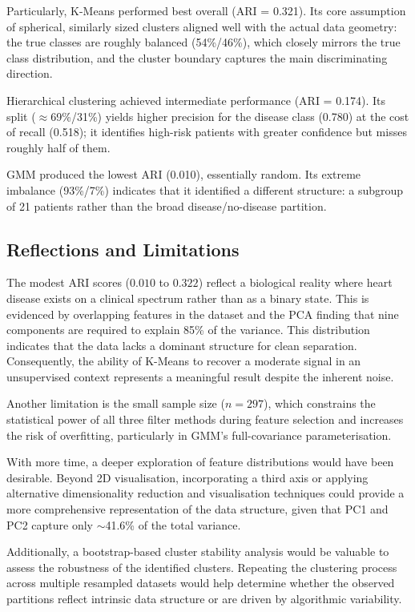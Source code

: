 \documentclass[twocolumn, fontsize=10pt]{article}
\begin{document}
Particularly,  {K-Means} performed best overall (ARI = 0.321). Its core assumption of spherical, similarly sized clusters aligned well with the actual data geometry: the true classes are roughly balanced (54\%/46\%), which closely mirrors the true class distribution, and the cluster boundary captures the main discriminating direction.

 {Hierarchical clustering} achieved intermediate performance (ARI = 0.174). Its split ($\approx$69\%/31\%) yields higher precision for the disease class (0.780) at the cost of recall (0.518); it identifies high-risk patients with greater confidence but misses roughly half of them.

 {GMM} produced the lowest ARI (0.010), essentially random. Its extreme imbalance (93\%/7\%) indicates that it identified a different structure: a subgroup of 21 patients rather than the broad disease/no-disease partition. 




\subsection{Reflections and Limitations}

The modest ARI scores ($0.010$ to $0.322$) reflect a biological reality where heart disease exists on a clinical spectrum rather than as a binary state. This is evidenced by overlapping features in the dataset and the PCA finding that nine components are required to explain 85\% of the variance. This distribution indicates that the data lacks a dominant structure for clean separation. Consequently, the ability of K-Means to recover a moderate signal in an unsupervised context represents a meaningful result despite the inherent noise.

Another limitation is the small sample size ($n = 297$), which constrains the statistical power of all three filter methods during feature selection and increases the risk of overfitting, particularly in GMM's full-covariance parameterisation. 

With more time, a deeper exploration of feature distributions would have been desirable. Beyond 2D visualisation, incorporating a third axis or applying alternative dimensionality reduction and visualisation techniques could provide a more comprehensive representation of the data structure, given that PC1 and PC2 capture only $\sim$41.6\% of the total variance.

Additionally, a bootstrap-based cluster stability analysis would be valuable to assess the robustness of the identified clusters. Repeating the clustering process across multiple resampled datasets would help determine whether the observed partitions reflect intrinsic data structure or are driven by algorithmic variability.
\end{document}
